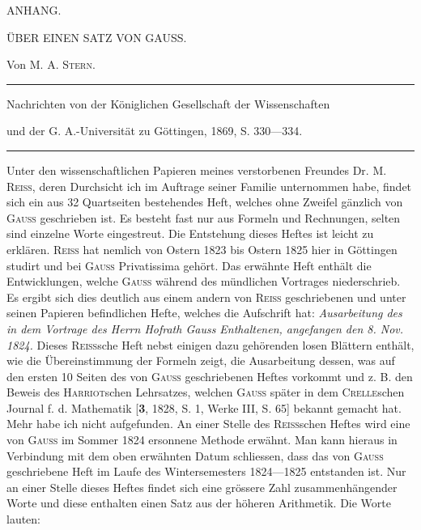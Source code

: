 \clearpage{}\NoSourceHead
\begin{center}
{\Large ANHANG.}\par\bigskip
{\Large ÜBER EINEN SATZ VON GAUSS.}\par\medskip
Von M. A. \textsc{Stern.}\par\medskip
\rule{.65\textwidth}{.3pt}\par
{\small Nachrichten von der Königlichen Gesellschaft der Wissenschaften\par
und der G. A.-Universität zu Göttingen, 1869, S. 330—334.}\par
\rule{.65\textwidth}{.3pt}
\end{center}
\noindent\hspace*{\parindent}Unter den wissenschaftlichen Papieren meines verstorbenen Freundes Dr. M. \textsc{Reiss}, deren Durchsicht ich im Auftrage seiner Familie unternommen habe, findet sich ein aus 32 Quartseiten bestehendes Heft, welches ohne Zweifel gänzlich von \textsc{Gauss} geschrieben ist. Es besteht fast nur aus Formeln und Rechnungen, selten sind einzelne Worte eingestreut. Die Entstehung dieses Heftes ist leicht zu erklären. \textsc{Reiss} hat nemlich von Ostern 1823 bis Ostern 1825 hier in Göttingen studirt und bei \textsc{Gauss} Privatissima gehört. Das erwähnte Heft enthält die Entwicklungen, welche \textsc{Gauss} während des mündlichen Vortrages niederschrieb. Es ergibt sich dies deutlich aus einem andern von \textsc{Reiss} geschriebenen und unter seinen Papieren befindlichen Hefte, welches die Aufschrift hat: \textit{Ausarbeitung des in dem Vortrage des Herrn Hofrath Gauss Enthaltenen, angefangen den 8. Nov. 1824.} Dieses \textsc{Reiss}sche Heft nebst einigen dazu gehörenden losen Blättern enthält, wie die Übereinstimmung der Formeln zeigt, die Ausarbeitung dessen, was auf den ersten 10 Seiten des von \textsc{Gauss} geschriebenen Heftes vorkommt und z. B. den Beweis des \textsc{Harriot}schen Lehrsatzes, welchen \textsc{Gauss} später in dem \textsc{Crelle}schen Journal f. d. Mathematik [\textbf{3}, 1828, S. 1, Werke III, S. 65] bekannt gemacht hat. Mehr habe ich nicht aufgefunden. An einer Stelle des \textsc{Reiss}schen Heftes wird eine von \textsc{Gauss} im Sommer 1824 ersonnene Methode erwähnt. Man kann hieraus in Verbindung mit dem oben erwähnten Datum schliessen, dass das von \textsc{Gauss} geschriebene Heft im Laufe des Wintersemesters 1824—1825 entstanden ist.
\newpage{}
Nur an einer Stelle dieses Heftes findet sich eine grössere Zahl zusammenhängender Worte und diese enthalten einen Satz aus der höheren Arithmetik. Die Worte lauten:
